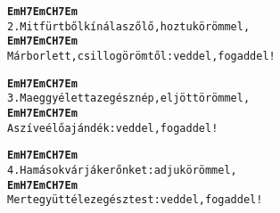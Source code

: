 \newpage
{}
\kottastart
{}
\kottaend
\begin{minipage}{\textwidth}
\begin{alltt}
\textbf{        Em      H7       EmC   H7         Em}
2. Mit fürtből kínál a szőlő, hoztuk örömmel,
\textbf{        Em         H7    Em   C    H7             Em}
   Már bor lett, csillog örömtől: vedd el, fogadd el!
\end{alltt}
\vspace{0.0cm}
\versszakspacing
\end{minipage}
\begin{minipage}{\textwidth}
\begin{alltt}
\textbf{      Em     H7      Em    C   H7          Em}
3. Ma eggyé lett az egész nép, eljött örömmel,
\textbf{       Em  H7   Em  C    H7             Em}
   A szíve élő ajándék: vedd el, fogadd el!
\end{alltt}
\vspace{0.0cm}
\versszakspacing
\end{minipage}
\begin{minipage}{\textwidth}
\begin{alltt}
\textbf{       Em    H7    Em   C   H7         Em}
4. Ha mások várják erőnket: adjuk örömmel,
\textbf{        Em     H7    Em     C     H7             Em}
   Mert együtt él ez egész test: vedd el, fogadd el!
\end{alltt}
\vspace{0.0cm}
\versszakspacing
\end{minipage}
